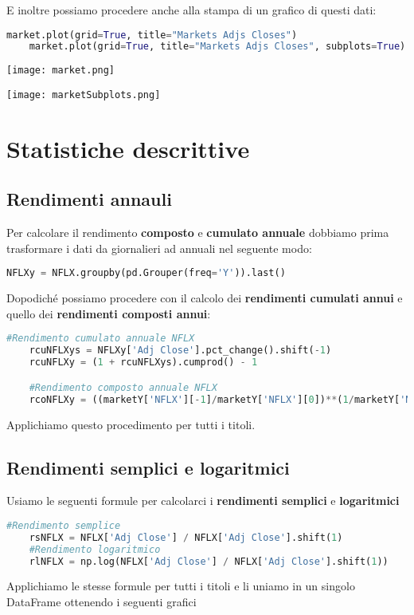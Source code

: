 \documentclass{report}
\begin{document}
E inoltre possiamo procedere anche alla stampa di un grafico di questi dati:
\begin{lstlisting}[language=python]
    market.plot(grid=True, title="Markets Adjs Closes")
    market.plot(grid=True, title="Markets Adjs Closes", subplots=True)
\end{lstlisting}

\texttt{[image: market.png]}

\texttt{[image: marketSubplots.png]}

\chapter{Statistiche descrittive}
\section{Rendimenti annauli}
Per calcolare il rendimento \textbf{composto} e \textbf{cumulato annuale} dobbiamo prima trasformare i dati da giornalieri ad annuali nel seguente modo:
\begin{lstlisting}[language=python]
    NFLXy = NFLX.groupby(pd.Grouper(freq='Y')).last()
\end{lstlisting}
Dopodiché possiamo procedere con il calcolo dei \textbf{rendimenti cumulati annui} e quello dei \textbf{rendimenti composti annui}:
\begin{lstlisting}[language=python]
    #Rendimento cumulato annuale NFLX
    rcuNFLXys = NFLXy['Adj Close'].pct_change().shift(-1)
    rcuNFLXy = (1 + rcuNFLXys).cumprod() - 1

    #Rendimento composto annuale NFLX
    rcoNFLXy = ((marketY['NFLX'][-1]/marketY['NFLX'][0])**(1/marketY['NFLX'].count()) - 1) *    100
\end{lstlisting}
Applichiamo questo procedimento per tutti i titoli.
\section{Rendimenti semplici e logaritmici}
Usiamo le seguenti formule per calcolarci i \textbf{rendimenti semplici} e \textbf{logaritmici}
\begin{lstlisting}[language=python]
    #Rendimento semplice
    rsNFLX = NFLX['Adj Close'] / NFLX['Adj Close'].shift(1)
    #Rendimento logaritmico
    rlNFLX = np.log(NFLX['Adj Close'] / NFLX['Adj Close'].shift(1))
\end{lstlisting}
Applichiamo le stesse formule per tutti i titoli e li uniamo in un singolo DataFrame ottenendo i seguenti grafici
\end{document}
